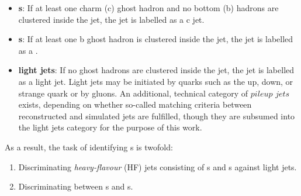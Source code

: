 \begin{itemize}
    \item \textbf{\cjet s}: If at least one charm (c) ghost hadron and no bottom (b) hadrons are clustered inside the jet, the jet is labelled as a c jet. 
    \item \textbf{\bjet s}: If at least one b ghost hadron is clustered inside the jet, the jet is labelled as a \bjet.
    \item \textbf{light jets}: If no ghost hadrons are clustered inside the jet, the jet is labelled as a light jet. Light jets may be initiated by quarks such as the up, down, or strange quark or by gluons. An additional, technical category of $pileup$ $jets$ exists, depending on whether so-called matching criteria between reconstructed and simulated jets are fulfilled, though they are subsumed into the light jets category for the purpose of this work.
\end{itemize}
As a result, the task of identifying \cjet s is twofold:
\begin{enumerate}
    \item Discriminating \textit{heavy-flavour} (HF) jets consisting of \bjet s and \cjet s against light jets.
    \item Discriminating between \bjet s and \cjet s. 
\end{enumerate}

